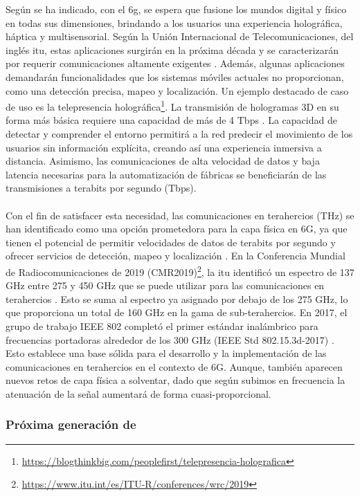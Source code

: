 Según se ha indicado, con el \gls{6g}, se espera que fusione los mundos digital y físico en todas sus dimensiones, brindando a los usuarios una experiencia holográfica, háptica y multisensorial. Según la Unión Internacional de Telecomunicaciones, del inglés \gls{itu}, estas aplicaciones surgirán en la próxima década y se caracterizarán por requerir comunicaciones altamente exigentes \cite{fg20192030}. Además, algunas aplicaciones demandarán funcionalidades que los sistemas móviles actuales no proporcionan, como una detección precisa, mapeo y localización. Un ejemplo destacado de caso de uso es la telepresencia holográfica\footnote{\url{https://blogthinkbig.com/peoplefirst/telepresencia-holografica}}. La transmisión de hologramas 3D en su forma más básica requiere una capacidad de más de 4 Tbps \cite{giordani2020toward}. La capacidad de detectar y comprender el entorno permitirá a la red predecir el movimiento de los usuarios sin información explícita, creando así una experiencia inmersiva a distancia. Asimismo, las comunicaciones de alta velocidad de datos y baja latencia necesarias para la automatización de fábricas se beneficiarán de las transmisiones a terabits por segundo (Tbps). \\
\\
Con el fin de satisfacer esta necesidad, las comunicaciones en terahercios (THz) se han identificado como una opción prometedora para la capa física en 6G, ya que tienen el potencial de permitir velocidades de datos de terabits por segundo y ofrecer servicios de detección, mapeo y localización \cite{latva2020key}. En la Conferencia Mundial de Radiocomunicaciones de 2019 (CMR2019)\footnote{\url{https://www.itu.int/es/ITU-R/conferences/wrc/2019}}, la \gls{itu} identificó un espectro de 137 GHz entre 275 y 450 GHz que se puede utilizar para las comunicaciones en terahercios \cite{kurner2020impact}. Esto se suma al espectro ya asignado por debajo de los 275 GHz, lo que proporciona un total de 160 GHz en la gama de sub-terahercios. En 2017, el grupo de trabajo IEEE 802 completó el primer estándar inalámbrico para frecuencias portadoras alrededor de los 300 GHz (IEEE Std 802.15.3d-2017) \cite{ieee2017ieee, petrov2020ieee}. Esto establece una base sólida para el desarrollo y la implementación de las comunicaciones en terahercios en el contexto de 6G. Aunque, también aparecen nuevos retos de capa física a solventar, dado que según subimos en frecuencia la atenuación de la señal aumentará de forma cuasi-proporcional.

\subsubsection{Próxima generación de }

